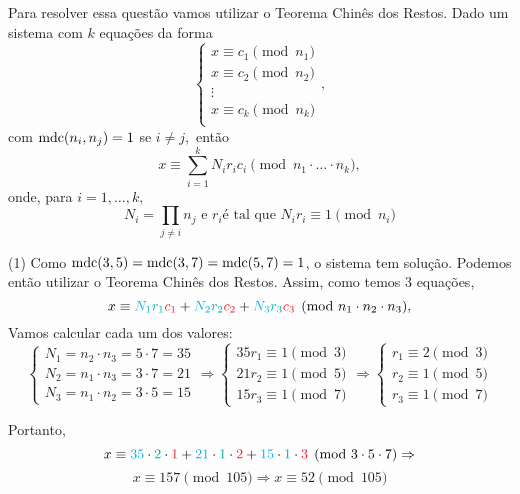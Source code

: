 \documentclass[12pt, a4paper]{article}
\newcommand{\mdc}{{\rm mdc}}
\newcommand{\negrito}[1]{\mbox{\boldmath{$#1$}}}
\newcommand{\itens}[1]{\begin{tasks}[label={(tsk[a])},label-width=3.6ex, label-format = {\bfseries}, column-sep = {0pt}](1) #1\end{tasks}}
\newcommand{\alt}[1]{\textcolor{Floresta}{$\negrito{(#1)} $}}
\begin{document}
\begin{solution}
Para resolver essa questão vamos utilizar o Teorema Chinês dos Restos. Dado um sistema com $k$ equações da forma
\[
\begin{cases}
x \equiv c_1 \pmod{n_1} \\
x \equiv c_2 \pmod{n_2} \\
\vdots \\
x \equiv c_k \pmod{n_k} \\
\end{cases},
\]
com $\mdc(n_i, n_j) = 1$ se $i \neq j,$ então 
\[
x \equiv \sum\limits_{i=1}^k N_ir_ic_i \pmod{n_1 \cdot \ldots \cdot n_k},
\]
onde, para $i = 1, \ldots, k,$
\[N_i = \prod\limits_{j \neq i} n_j \mbox{ e } r_i \mbox{é tal que } N_ir_i \equiv 1 \pmod{n_i}\]
 \itens{   \task[\alt{a}] Como $\mdc(3,5)=\mdc(3,7)=\mdc(5,7)=1$, o sistema tem solução. Podemos então utilizar o Teorema Chinês dos Restos. Assim, como temos 3 equações,
 \[x \equiv \textcolor{Cyan}{N_1}\textcolor{Emerald}{r_1}\textcolor{Red}{c_1} + \textcolor{Cyan}{N_2}\textcolor{Emerald}{r_2}\textcolor{Red}{c_2} + \textcolor{Cyan}{N_3}\textcolor{Emerald}{r_3}\textcolor{Red}{c_3} \pmod{n_1 \cdot n_2 \cdot n_3},\]
Vamos calcular cada um dos valores:
        $$\left\{ \begin{array}{l}
             N_1 = n_2 \cdot n_3 = 5\cdot7=35\\
             N_2 = n_1 \cdot n_3 = 3\cdot7=21\\
             N_3 = n_1 \cdot n_2 = 3\cdot5=15
        \end{array}\right.\Rightarrow
        \left\{ \begin{array}{l}
             35r_1 \equiv 1 \pmod{3}\\
             21r_2 \equiv 1 \pmod{5}\\
             15r_3 \equiv 1 \pmod{7}
        \end{array}\right. \Rightarrow 
        \left\{ \begin{array}{l}
             r_1 \equiv 2\pmod 3\\
             r_2 \equiv 1\pmod 5\\
             r_3 \equiv 1\pmod 7
        \end{array}\right.$$
        }
    Portanto,
        $$x\equiv\textcolor{Cyan}{35}\cdot\textcolor{Emerald}{2}\cdot\textcolor{Red}{1}+\textcolor{Cyan}{21}\cdot\textcolor{Emerald}{1}\cdot\textcolor{Red}{2}+\textcolor{Cyan}{15}\cdot\textcolor{Emerald}{1}\cdot\textcolor{Red}{3} \pmod{3\cdot5\cdot7} \Rightarrow$$
        $$x\equiv157 \pmod{105} \Rightarrow \boxed{ x \equiv 52 \pmod{105}}$$

\end{solution}
\end{document}
